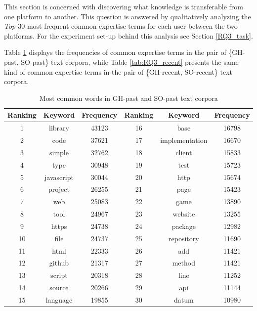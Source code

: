         This section is concerned with discovering what knowledge is transferable from one platform to another. This question is answered by qualitatively analyzing the \emph{Top-$30$} most frequent common expertise terms for each user between the two platforms. For the experiment set-up behind this analysis see Section \ref{RQ3_task}.
        
        Table \ref{tab:RQ3_past} displays the frequencies of common expertise terms in the pair of \{GH-past, SO-past\} text corpora, while Table \ref{tab:RQ3_recent} presents the same kind of common expertise terms in the pair of \{GH-recent, SO-recent\} text corpora.
        
        \begin{table}
          \centering
          \caption{Most common words in GH-past and SO-past text corpora}\label{tab:RQ3_past}
            \vspace{6pt} %
          \begin{tabular}{|c c c | c c c|}
            \hline
            Ranking & Keyword & Frequency & Ranking & Keyword & Frequency \\
            \hline\hline
            1 & library & 43123 & 16 & base & 16798 \\
            2 & code & 37621 & 17 & implementation & 16670 \\
            3 & simple & 32762 & 18 & client & 15833 \\
            4 & type & 30948 & 19 & test & 15723 \\
            5 & javascript & 30044 & 20 & http & 15674 \\
            6 & project & 26255 & 21 & page & 15423 \\
            7 & web & 25083 & 22 & game & 13890 \\
            8 & tool & 24967 & 23 & website & 13255 \\
            9 & https & 24738 & 24 & package & 12982 \\
            10 & file & 24737 & 25 & repository & 11690 \\
            11 & html & 22333 & 26 & add & 11421 \\
            12 & github & 21317 & 27 & method & 11421 \\
            13 & script & 20318 & 28 & line & 11252 \\
            14 & source & 20266 & 29 & api & 11144 \\
            15 & language & 19855 & 30 & datum & 10980 \\
            \hline
          \end{tabular}
        \end{table}
        
